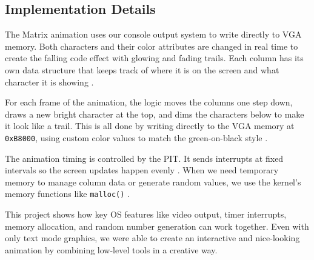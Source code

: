 \documentclass[a4paper,11pt]{article}
\begin{document}
\subsection{Implementation Details}

The Matrix animation uses our console output system to write directly to VGA memory. Both characters and their color attributes are changed in real time to create the falling code effect with glowing and fading trails. Each column has its own data structure that keeps track of where it is on the screen and what character it is showing \cite{VGA}.

For each frame of the animation, the logic moves the columns one step down, draws a new bright character at the top, and dims the characters below to make it look like a trail. This is all done by writing directly to the VGA memory at \texttt{0xB8000}, using custom color values to match the green-on-black style \cite{VGA}.

The animation timing is controlled by the PIT. It sends interrupts at fixed intervals so the screen updates happen evenly \cite{OSDev_PIT}. When we need temporary memory to manage column data or generate random values, we use the kernel’s memory functions like \texttt{malloc()} \cite{GNU_malloc}.

This project shows how key OS features like video output, timer interrupts, memory allocation, and random number generation can work together. Even with only text mode graphics, we were able to create an interactive and nice-looking animation by combining low-level tools in a creative way.
\end{document}
